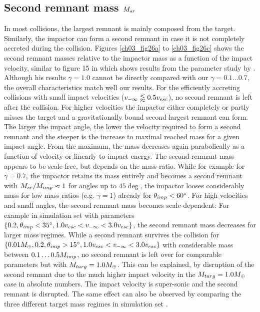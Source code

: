 \subsection{Second remnant mass $M_{sr}$}
In most collisions, the largest remnant is mainly composed from the target. Similarly, the impactor can form a second remnant in case it is not completely accreted during the collision. Figures \ref{ch03_fig26a} to \ref{ch03_fig26c} shows the second remnant masses relative to the impactor mass as a function of the impact velocity, similar to figure 15 in \cite{Asphaug:2010p3539} which shows results from the parameter study by \cite{Agnor:2004p3329}. Although his results $\gamma = 1.0$ cannot be directly compared with our $\gamma = 0.1 \dots 0.7$, the overall characteristics match well our results. For the efficiently accreting collisions with small impact velocities ($v_{-\infty} \lessapprox 0.5 v_{esc}$), no second remnant is left after the collision. For higher velocities the impactor either completely or partly misses the target and a gravitationally bound second largest remnant can form. The larger the impact angle, the lower the velocity required to form a second remnant and the steeper is the increase to maximal reached mass for a given impact angle. From the maximum, the mass decreases again parabolically as a function of velocity or linearly to impact energy. The second remnant mass appears to be scale-free, but depends on the mass ratio. While for example for $\gamma = 0.7$, the impactor retains its mass entirely and becomes a second remnant with $M_{sr} / M_{imp} \approx 1$ for angles up to $45 \deg$, the impactor looses considerably mass for low mass ratios (e.g. $\gamma = 1$) already for $\theta_{imp} < 60 ^\circ$. For high velocities and small angles, the second remnant mass becomes scale-dependent: For example in simulation set \css with parameters $\{0.2, \theta_{imp} < 35 ^\circ, 1.0 v_{esc} < v_{-\infty} < 3.0 v_{esc} \}$, the second remnant mass decreases for larger mass regimes. While a  second remnant survives the collision for $\{0.01 M_{\oplus}, 0.2, \theta_{imp} > 15 ^\circ, 1.0 v_{esc} < v_{-\infty} < 3.0 v_{esc} \}$ with considerable mass between $0.1 \dots 0.5 M_{imp}$, no second remnant is left over for comparable parameters but with $M_{targ} = 1.0 M_{\oplus}$. This can be explained, by disruption of the second remnant due to the much higher impact velocity in the $M_{targ} = 1.0 M_{\oplus}$ case in absolute numbers. The impact velocity is super-sonic and the second remnant is disrupted. The same effect can also be observed by comparing the three different target mass regimes in simulation set \iss.


